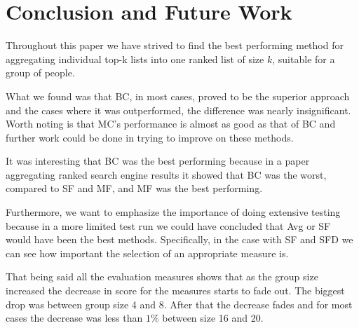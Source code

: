 \section{Conclusion and Future Work}\label{sec:conclusion}
Throughout this paper we have strived to find the best performing method for aggregating individual top-k lists into one ranked list of size $k$, suitable for a group of people.

What we found was that BC, in most cases, proved to be the superior approach and the cases where it was outperformed, the difference was nearly insignificant. Worth noting is that MC's performance is almost as good as that of BC and further work could be done in trying to improve on these methods.

It was interesting that BC was the best performing because in a paper aggregating ranked search engine results it showed that BC was the worst, compared to SF and MF, and MF was the best performing\citep{rank:aggregation}. 

Furthermore, we want to emphasize the importance of doing extensive testing because in a more limited test run we could have concluded that Avg or SF would have been the best methods. Specifically, in the case with SF and SFD we can see how important the selection of an appropriate measure is.

That being said all the evaluation measures shows that as the group size increased the decrease in score for the measures starts to fade out. The biggest drop was between group size 4 and 8. After that the decrease fades and for most cases the decrease was less than $1\%$ between size 16 and 20.


